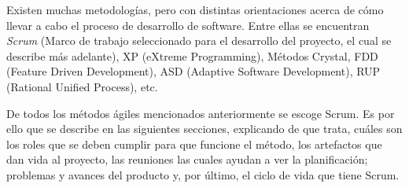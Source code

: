 Existen muchas metodologías, pero con distintas orientaciones acerca de cómo llevar a cabo el proceso de desarrollo de software. Entre ellas se encuentran \emph{Scrum} (Marco de trabajo seleccionado para el desarrollo del proyecto, el cual se describe más adelante), XP (eXtreme Programming), Métodos Crystal, FDD (Feature Driven Development), ASD (Adaptive Software Development), RUP (Rational Unified Process), etc.

De todos los métodos ágiles mencionados anteriormente se escoge Scrum. Es por ello que se describe en las siguientes secciones, explicando de que trata, cuáles son los roles que se deben cumplir para que funcione el método, los artefactos que dan vida al proyecto, las reuniones las cuales ayudan a ver la planificación; problemas y avances del producto y, por último, el ciclo de vida que tiene Scrum.